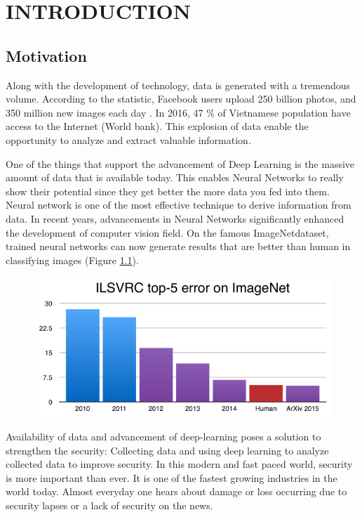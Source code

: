 \chapter{INTRODUCTION}
\label{introduction}
\section{Motivation}
Along with the development of technology, data is generated with a tremendous volume. According to the statistic, Facebook users upload 250 billion photos, and 350 million new images each day 
. In 2016, 47 \% of Vietnamese population have access to the Internet (World bank). This explosion of data enable the opportunity to analyze and extract valuable information.

One of the things that support the advancement of Deep Learning is the massive amount of data that is available today. This enables Neural Networks to really show their potential since they get better the more data you fed into them. Neural network is one of the most effective technique to derive information from data. In recent years, advancements in Neural Networks significantly enhanced the development of computer vision field. On the famous ImageNetdataset, trained neural networks can now generate results that are better than human in classifying images (Figure \ref{chap3:deeplearning_vs_human}). 

\begin{center}
    \begin{figure}[H]
    \centering
    \includegraphics[width=0.75\columnwidth]{images/chap3/deeplearning_vs_human.png}
    \label{chap3:deeplearning_vs_human}
    \end{figure}
\end{center}
Availability of data and advancement of deep-learning poses a solution to strengthen the security: Collecting data and using deep learning to analyze collected data to improve security. 
In this modern and fast paced world, security is more important than ever. It is one of the fastest growing industries in the world today.
Almost everyday one hears about damage or loss occurring due to security lapses or a lack of security on the news. 

